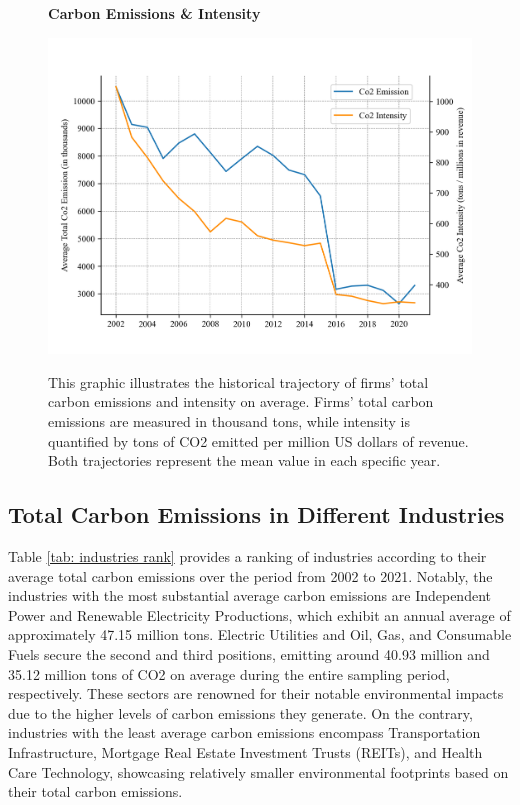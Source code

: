 \documentclass[12pt]{article}
\begin{document}
\begin{figure}[!ht]
\centering
\caption{\textbf{Carbon Emissions \& Intensity}}
\includegraphics{graphics/co2_trend.png}
\label{fig: co2_intensity}
\caption*{\footnotesize{This graphic illustrates the historical trajectory of firms' total carbon emissions and intensity on average. Firms' total carbon emissions are measured in thousand tons, while intensity is quantified by tons of CO2 emitted per million US dollars of revenue. Both trajectories represent the mean value in each specific year.}}
\end{figure}

\subsection{Total Carbon Emissions in Different Industries}

Table \ref{tab: industries rank} provides a ranking of industries according to their average total carbon emissions over the period from 2002 to 2021. Notably, the industries with the most substantial average carbon emissions are Independent Power and Renewable Electricity Productions, which exhibit an annual average of approximately 47.15 million tons. Electric Utilities and Oil, Gas, and Consumable Fuels secure the second and third positions, emitting around 40.93 million and 35.12 million tons of CO2 on average during the entire sampling period, respectively. These sectors are renowned for their notable environmental impacts due to the higher levels of carbon emissions they generate. On the contrary, industries with the least average carbon emissions encompass Transportation Infrastructure, Mortgage Real Estate Investment Trusts (REITs), and Health Care Technology, showcasing relatively smaller environmental footprints based on their total carbon emissions.
\end{document}

